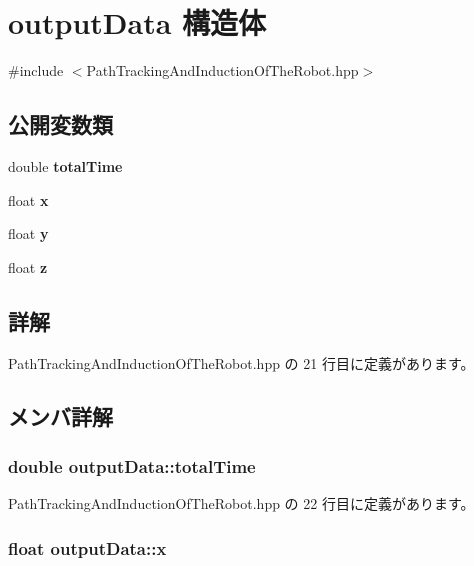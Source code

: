 \section{output\-Data 構造体}
\label{structoutput_data}


{\ttfamily \#include $<$Path\-Tracking\-And\-Induction\-Of\-The\-Robot.\-hpp$>$}

\subsection*{公開変数類}
\begin{DoxyCompactItemize}
\item 
double {\bf total\-Time}
\item 
float {\bf x}
\item 
float {\bf y}
\item 
float {\bf z}
\end{DoxyCompactItemize}


\subsection{詳解}


 Path\-Tracking\-And\-Induction\-Of\-The\-Robot.\-hpp の 21 行目に定義があります。



\subsection{メンバ詳解}
\subsubsection[{total\-Time}]{\setlength{\rightskip}{0pt plus 5cm}double output\-Data\-::total\-Time}\label{structoutput_data_a79c4eabc287b3d1783b3d9d3c036a625}


 Path\-Tracking\-And\-Induction\-Of\-The\-Robot.\-hpp の 22 行目に定義があります。

\subsubsection[{x}]{\setlength{\rightskip}{0pt plus 5cm}float output\-Data\-::x}\label{structoutput_data_a6bbddab2722a262bf2c3f5b11cfab280}


